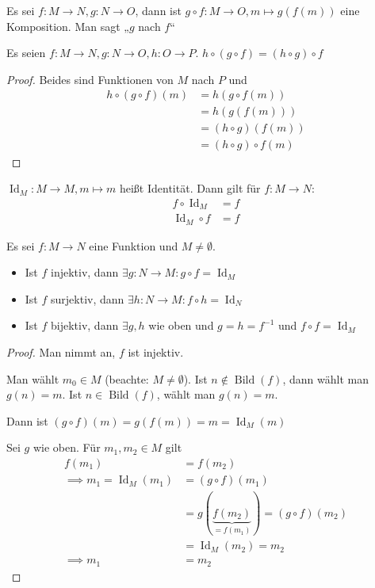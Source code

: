 \begin{definition}
  Es sei $f: M \to N, g: N \to O$, dann ist $g \circ f: M \to O, m \mapsto g(f(m))$ eine Komposition\index[sym]{$\circ$}. Man sagt „$g$ nach $f$“
\end{definition}
\begin{lemma}
  Es seien $f: M \to N, g: N \to O, h: O \to P$. $h \circ (g \circ f) = (h \circ g) \circ f$
\end{lemma}
\begin{proof}
  Beides sind Funktionen von $M$ nach $P$ und
  \begin{align*}
    h \circ (g \circ f) (m) &= h (g \circ f (m)) \\
    \, &= h(g(f(m))) \\
    \, &= (h \circ g)(f(m)) \\
    \, &= (h \circ g) \circ f (m)
  \end{align*}
\end{proof}

\begin{remark}
  $\operatorname{Id}_M: M \to M, m \mapsto m$ heißt Identität. Dann gilt für $f: M \to N$:
  \begin{align*}
    f \circ \operatorname{Id}_M &= f \\
    \operatorname{Id}_M \circ f &= f
  \end{align*}
\end{remark}

\begin{theorem}
  Es sei $f: M \to N$ eine Funktion und $M \ne \emptyset$.
  \begin{itemize}
  \item Ist $f$ injektiv, dann $\exists g: N \to M: g \circ f = \operatorname{Id}_M$
  \item Ist $f$ surjektiv, dann $\exists h: N \to M: f \circ h = \operatorname{Id}_N$
  \item Ist $f$ bijektiv, dann $\exists g, h$ wie oben und $g = h = f^{-1}$ und $f \circ f = \operatorname{Id}_M$
  \end{itemize}
\end{theorem}
\begin{proof}
  Man nimmt an, $f$ ist injektiv.

  Man wählt $m_0 \in M$ (beachte: $M \ne \emptyset$). Ist $n \not\in \operatorname{Bild}(f)$, dann wählt man $g(n) = m$. Ist $n \in \operatorname{Bild}(f)$, wählt man $g(n) = m$.

  Dann ist $(g \circ f)(m) = g(f(m)) = m = \operatorname{Id}_M(m)$

  Sei $g$ wie oben. Für $m_1, m_2 \in M$ gilt
  \begin{align*}
    f(m_1) &= f(m_2) \\
    \implies m_1 = \operatorname{Id}_M(m_1) &= (g \circ f)(m_1) \\
    \, &= g(\underbrace{f(m_2)}_{= f(m_{1})}) = (g \circ f)(m_2) \\
    \, &= \operatorname{Id}_M(m_2) = m_2 \\
    \implies m_1 &= m_2
  \end{align*}
\end{proof}